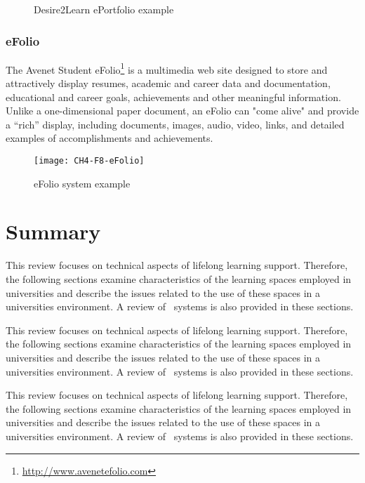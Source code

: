 \begin{figure}[htb]
\centering
\setlength\fboxsep{0pt}
\setlength\fboxrule{0.5pt}
\fbox{\texttt{[image: CH4-F7-D2L]}}
\caption[Desire2Learn ePortfolio example]{Desire2Learn ePortfolio example
\citep{Desire2LearnIncorporated2011}}
\label{fig:d2ep}
\end{figure}
 
\subsubsection{eFolio}

The Avenet Student eFolio\footnote{\url{http://www.avenetefolio.com}} is a
multimedia web site designed to store and attractively display resumes, academic
and career data and documentation, educational and career goals, achievements
and other meaningful information. Unlike a one-dimensional paper document, an
eFolio can "come alive" and provide a ``rich'' display, including documents,
images, audio, video, links, and detailed examples of accomplishments and
achievements.

\begin{figure}[htb]
\centering
\setlength\fboxsep{0pt}
\setlength\fboxrule{0.5pt}
\texttt{[image: CH4-F8-eFolio]}
\caption[eFolio system example]{eFolio system example \citep{EFolioMinnesota2011}}
\label{fig:efolio}
\end{figure}

\section{Summary}

This review focuses on technical aspects of lifelong learning support.
Therefore, the following sections examine characteristics of the learning spaces
employed in universities and describe the issues related to the use of these
spaces in a universities environment. A review of \ep~systems is also
provided in these sections.

This review focuses on technical aspects of lifelong learning support.
Therefore, the following sections examine characteristics of the learning spaces
employed in universities and describe the issues related to the use of these
spaces in a universities environment. A review of \ep~systems is also
provided in these sections.

This review focuses on technical aspects of lifelong learning support.
Therefore, the following sections examine characteristics of the learning spaces
employed in universities and describe the issues related to the use of these
spaces in a universities environment. A review of \ep~systems is also
provided in these sections.